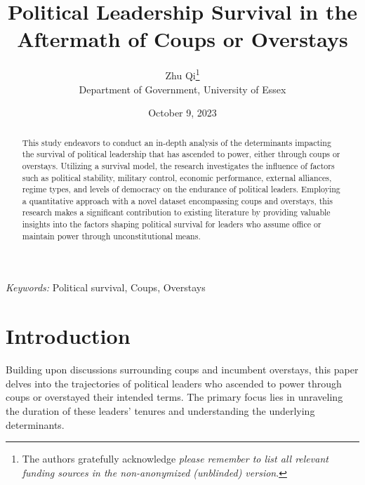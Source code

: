 \documentclass[
  a4paper,
  12pt]{article}
\begin{document}
\def\spacingset#1{\renewcommand{\baselinestretch}%
{#1}\small\normalsize} \spacingset{1}



\date{October 9, 2023}
\title{\bf Political Leadership Survival in the Aftermath of Coups or
Overstays}
\author{
Zhu Qi\thanks{The authors gratefully acknowledge \emph{please remember
to list all relevant funding sources in the non-anonymized (unblinded)
version}.}\\
Department of Government, University of Essex\\
}
\maketitle

\bigskip
\bigskip
\begin{abstract}
This study endeavors to conduct an in-depth analysis of the determinants
impacting the survival of political leadership that has ascended to
power, either through coups or overstays. Utilizing a survival model,
the research investigates the influence of factors such as political
stability, military control, economic performance, external alliances,
regime types, and levels of democracy on the endurance of political
leaders. Employing a quantitative approach with a novel dataset
encompassing coups and overstays, this research makes a significant
contribution to existing literature by providing valuable insights into
the factors shaping political survival for leaders who assume office or
maintain power through unconstitutional means.
\end{abstract}

\noindent%
{\it Keywords:} Political survival, Coups, Overstays
\vfill

\newpage
\spacingset{1.9} %
\section{Introduction}\label{introduction}

Building upon discussions surrounding coups and incumbent overstays,
this paper delves into the trajectories of political leaders who
ascended to power through coups or overstayed their intended terms. The
primary focus lies in unraveling the duration of these leaders' tenures
and understanding the underlying determinants.
\end{document}
